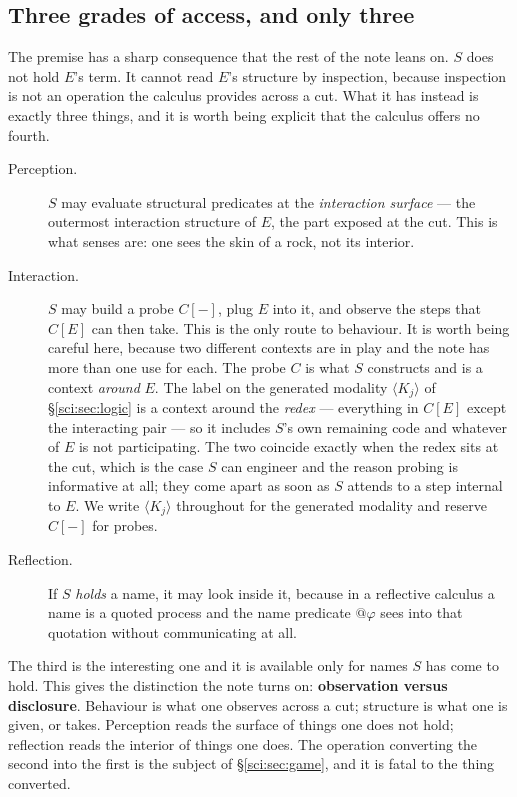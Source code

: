 \subsection{Three grades of access, and only three}\label{sci:S2.2}

The premise has a sharp consequence that the rest of the note leans on. $S$ does not hold $E$'s term.
It cannot read $E$'s structure by inspection, because inspection is not an operation the calculus
provides across a cut. What it has instead is exactly three things, and it is worth being explicit
that the calculus offers no fourth.

\begin{description}
\item[Perception.] $S$ may evaluate structural predicates at the \emph{interaction surface} --- the
outermost interaction structure of $E$, the part exposed at the cut. This is what senses are: one
sees the skin of a rock, not its interior.
\item[Interaction.] $S$ may build a probe $C[-]$, plug $E$ into it, and observe the steps that
$C[E]$ can then take. This is the only route to behaviour. It is worth being careful here, because
two different contexts are in play and the note has more than one use for each. The probe $C$ is
what $S$ constructs and is a context \emph{around} $E$. The label on the generated modality
$\langle K_j \rangle$ of \S\ref{sci:sec:logic} is a context around the \emph{redex} --- everything in
$C[E]$ except the interacting pair --- so it includes $S$'s own remaining code and whatever of $E$
is not participating. The two coincide exactly when the redex sits at the cut, which is the case
$S$ can engineer and the reason probing is informative at all; they come apart as soon as $S$
attends to a step internal to $E$. We write $\langle K_j \rangle$ throughout for the generated
modality and reserve $C[-]$ for probes.
\item[Reflection.] If $S$ \emph{holds} a name, it may look inside it, because in a reflective calculus
a name is a quoted process and the name predicate $@\varphi$ sees into that quotation without
communicating at all.
\end{description}

The third is the interesting one and it is available only for names $S$ has come to hold. This gives
the distinction the note turns on: \textbf{observation versus disclosure}. Behaviour is what one
observes across a cut; structure is what one is given, or takes. Perception reads the surface of
things one does not hold; reflection reads the interior of things one does. The operation converting
the second into the first is the subject of \S\ref{sci:sec:game}, and it is fatal to the thing converted.

